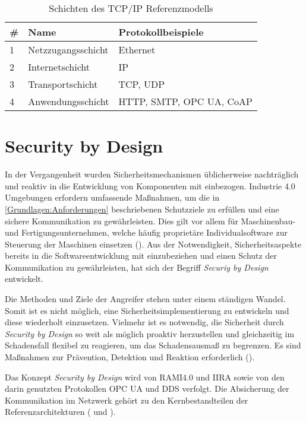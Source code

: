 \begin{table}[h]
  \caption{Schichten des TCP/IP Referenzmodells}
  \label{Grundlagen:TCP/IP Referenzmodell-img}
  \renewcommand{\arraystretch}{1.2}
  \centering
  \sffamily
  \begin{footnotesize}
    \begin{tabular}{l l l}
    \toprule
    \textbf{\#} & \textbf{Name} & \textbf{Protokollbeispiele}\\
    \midrule
    1	&	Netzzugangsschicht & Ethernet\\
    2	&	Internetschicht &	\ac{IP}\\
    3	&	Transportschicht & \ac{TCP}, \ac{UDP}\\
    4	&	Anwendungsschicht	&	\ac{HTTP}, \ac{SMTP}, \ac{OPC UA}, \ac{CoAP}\\
    \bottomrule
    \end{tabular}
  \end{footnotesize}
  \rmfamily
\end{table}

\section{Security by Design}
\label{Grundlagen:Security by Design}
In der Vergangenheit wurden Sicherheitsmechanismen üblicherweise nachträglich und reaktiv in die Entwicklung von Komponenten mit einbezogen. Industrie 4.0 Umgebungen erfordern umfassende Maßnahmen, um die in \autoref{Grundlagen:Anforderungen} beschriebenen Schutzziele zu erfüllen und eine sichere Kommunikation zu gewährleisten. Dies gilt vor allem für Maschinenbau- und Fertigungsunternehmen, welche häufig proprietäre Individualsoftware zur Steuerung der Maschinen einsetzen (\cite{DTAG2016}). Aus der Notwendigkeit, Sicherheitsaspekte bereits in die Softwareentwicklung mit einzubeziehen und einen Schutz der Kommunikation zu gewährleisten, hat sich der Begriff \textit{Securiy by Design} entwickelt.

Die Methoden und Ziele der Angreifer stehen unter einem ständigen Wandel. Somit ist es nicht möglich, eine Sicherheitsimplementierung zu entwickeln und diese wiederholt einzusetzen. Vielmehr ist es notwendig, die Sicherheit durch \textit{Security by Design} so weit als möglich proaktiv herzustellen und gleichzeitig im Schadensfall flexibel zu reagieren, um das Schadensausmaß zu begrenzen. Es sind Maßnahmen zur Prävention, Detektion und Reaktion erforderlich (\cite{Umsetzung2015}). 

Das Konzept \textit{Security by Design} wird von \ac{RAMI4.0} und \ac{IIRA} sowie von den darin genutzten Protokollen \ac{OPC UA} und \ac{DDS} verfolgt. Die Absicherung der Kommunikation im Netzwerk gehört zu den Kernbestandteilen der Referenzarchitekturen (\cite{iirasec2017} und \cite{opcpt2}).

